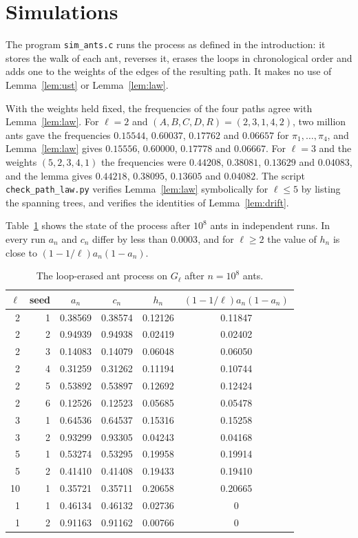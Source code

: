 \documentclass[11pt]{amsart}
\theoremstyle{remark}
\begin{document}
\section{Simulations}\label{sec:sim}

The program \texttt{sim\_ants.c} runs the process as defined in the introduction: it stores the walk of each ant,
reverses it, erases the loops in chronological order and adds one to the weights of the edges of the resulting path.
It makes no use of Lemma~\ref{lem:ust} or Lemma~\ref{lem:law}.

With the weights held fixed, the frequencies of the four paths agree with Lemma~\ref{lem:law}. For $\ell=2$ and
$(A,B,C,D,R)=(2,3,1,4,2)$, two million ants gave the frequencies $0.15544$, $0.60037$, $0.17762$ and $0.06657$ for
$\pi_1,\dots,\pi_4$, and Lemma~\ref{lem:law} gives $0.15556$, $0.60000$, $0.17778$ and $0.06667$. For $\ell=3$ and
the weights $(5,2,3,4,1)$ the frequencies were $0.44208$, $0.38081$, $0.13629$ and $0.04083$, and the lemma gives
$0.44218$, $0.38095$, $0.13605$ and $0.04082$. The script
\texttt{check\_path\_law.py} verifies Lemma~\ref{lem:law} symbolically for $\ell\le5$ by listing the spanning trees,
and verifies the identities of Lemma~\ref{lem:drift}.

Table~\ref{tab:runs} shows the state of the process after $10^8$ ants in independent runs. In every run $a_n$ and
$c_n$ differ by less than $0.0003$, and for $\ell\ge2$ the value of $h_n$ is close to $(1-1/\ell)a_n(1-a_n)$.

\begin{table}[ht]
\centering
\begin{tabular}{rrcccc}
\toprule
$\ell$ & seed & $a_n$ & $c_n$ & $h_n$ & $(1-1/\ell)a_n(1-a_n)$\\
\midrule
2 & 1 & 0.38569 & 0.38574 & 0.12126 & 0.11847\\
2 & 2 & 0.94939 & 0.94938 & 0.02419 & 0.02402\\
2 & 3 & 0.14083 & 0.14079 & 0.06048 & 0.06050\\
2 & 4 & 0.31259 & 0.31262 & 0.11194 & 0.10744\\
2 & 5 & 0.53892 & 0.53897 & 0.12692 & 0.12424\\
2 & 6 & 0.12526 & 0.12523 & 0.05685 & 0.05478\\
3 & 1 & 0.64536 & 0.64537 & 0.15316 & 0.15258\\
3 & 2 & 0.93299 & 0.93305 & 0.04243 & 0.04168\\
5 & 1 & 0.53274 & 0.53295 & 0.19958 & 0.19914\\
5 & 2 & 0.41410 & 0.41408 & 0.19433 & 0.19410\\
10 & 1 & 0.35721 & 0.35711 & 0.20658 & 0.20665\\
1 & 1 & 0.46134 & 0.46132 & 0.02736 & 0\\
1 & 2 & 0.91163 & 0.91162 & 0.00766 & 0\\
\bottomrule
\end{tabular}
\caption{The loop-erased ant process on $G_\ell$ after $n=10^8$ ants.}\label{tab:runs}
\end{table}
\end{document}

